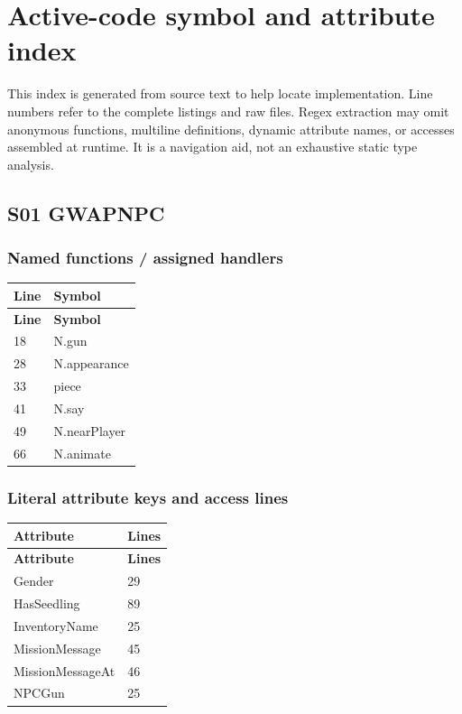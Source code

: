 \chapter{Active-code symbol and attribute index}
This index is generated from source text to help locate implementation.\allowbreak{} Line numbers refer to the complete listings and raw files.\allowbreak{} Regex extraction may omit anonymous functions, multiline definitions, dynamic attribute names, or accesses assembled at runtime.\allowbreak{} It is a navigation aid, not an exhaustive static type analysis.\allowbreak{}

\section{S01 GWAPNPC}
\subsection{Named functions /\allowbreak{} assigned handlers}
\begin{longtable}{p{}p{}}
\toprule
\textbf{Line} & \textbf{Symbol} \\ \midrule
\endfirsthead
\textbf{Line} & \textbf{Symbol} \\ \midrule
\endhead
18 & N.\allowbreak{}gun \\
28 & N.\allowbreak{}appearance \\
33 & piece \\
41 & N.\allowbreak{}say \\
49 & N.\allowbreak{}nearPlayer \\
66 & N.\allowbreak{}animate \\
\bottomrule
\end{longtable}
\subsection{Literal attribute keys and access lines}
\begin{longtable}{p{}p{}}
\toprule
\textbf{Attribute} & \textbf{Lines} \\ \midrule
\endfirsthead
\textbf{Attribute} & \textbf{Lines} \\ \midrule
\endhead
Gender & 29 \\
HasSeedling & 89 \\
InventoryName & 25 \\
MissionMessage & 45 \\
MissionMessageAt & 46 \\
NPCGun & 25 \\
\bottomrule
\end{longtable}
